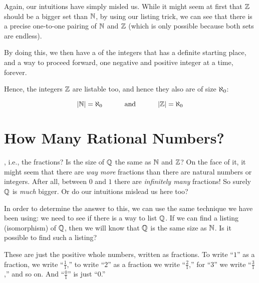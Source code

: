 \documentclass[../../../main.tex]{subfiles}
\begin{document}
\begin{aside}
  \begin{remark}
    Again, our intuitions have simply misled us. While it might seem at first that $\Ints/$ should be a bigger set than $\Nats/$, by using our listing trick, we can see that there is a precise one-to-one pairing of $\Nats/$ and $\Ints/$ (which is only possible because both sets are endless).
  \end{remark}
\end{aside}

By doing this, we then have a  of the integers that has a definite starting place, and a way to proceed forward, one negative and positive integer at a time, forever.
 
Hence, the integers $\Ints/$ are listable too, and hence they also are of size $\AlephZero/$:

\begin{equation*}
  \cardinality{\Nats/} = \AlephZero/ 
  \hskip1cm \text{ and } \hskip 1cm
  \cardinality{\Ints/} = \AlephZero/ 
\end{equation*}


\section{How Many Rational Numbers?}

, i.e., the fractions? Is the size of $\Rationals/$ the same as $\Nats/$ and $\Ints/$? On the face of it, it might seem that there are \emph{way more} fractions than there are natural numbers or integers. After all, between $0$ and $1$ there are \emph{infinitely many} fractions! So surely $\Rationals/$ is \emph{much} bigger. Or do our intuitions mislead us here too?

In order to determine the answer to this, we can use the same technique we have been using: we need to see if there is a way to list $\Rationals/$. If we can find a listing (isomorphism) of $\Rationals/$, then we will know that $\Rationals/$ is the same size as $\Nats/$. Is it possible to find such a listing?

\begin{aside}
  \begin{remark}
    These are just the positive whole numbers, written as fractions. To write ``$1$'' as a fraction, we write ``$\frac{1}{1}$,'' to write ``$2$'' as a fraction we write ``$\frac{2}{1}$,'' for ``$3$'' we write ``$\frac{3}{1}$,'' and so on. And ``$\frac{0}{1}$'' is just ``$0$.''
  \end{remark}
\end{aside}
\end{document}

